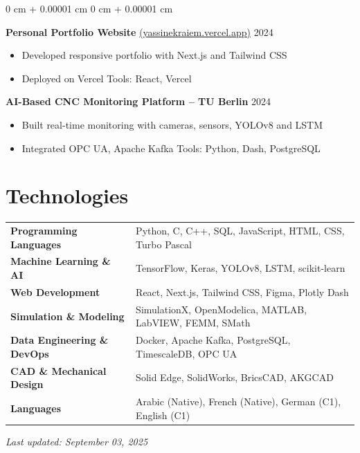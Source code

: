 \documentclass[10pt, letterpaper]{article}
\newenvironment{highlights}{
    \begin{itemize}[
        topsep=0.10 cm,
        parsep=0.10 cm,
        partopsep=0pt,
        itemsep=0pt,
        leftmargin=0 cm + 10pt
    ]
}{
    \end{itemize}
} %
\newenvironment{onecolentry}{
    \begin{adjustwidth}{
        0 cm + 0.00001 cm
    }{
        0 cm + 0.00001 cm
    }
}{
    \end{adjustwidth}
} %
\begin{document}
\begin{onecolentry}
\textbf{Personal Portfolio Website }\href{https://yassinekraiem.vercel.app}{\small (yassinekraiem.vercel.app)}
  \hfill \textsc{\phantom{202}2024} \\
\begin{highlights}
  \item Developed responsive portfolio with Next.js and Tailwind CSS
  \item Deployed on Vercel \textbullet{} Tools: React, Vercel
\end{highlights}

\textbf{AI-Based CNC Monitoring Platform – TU Berlin} \hfill \textsc{\phantom{202}2024} \\

\begin{highlights}
  \item Built real-time monitoring with cameras, sensors, YOLOv8 and LSTM 
  \item Integrated OPC UA, Apache Kafka \textbullet{} Tools: Python, Dash, PostgreSQL
\end{highlights}

\end{onecolentry}
    \vspace{-0.35cm}

\section{Technologies}
\begin{tabular}{@{}p{5cm}p{10.5cm}@{}}
\textbf{Programming Languages} & Python, C, C++, SQL, JavaScript, HTML, CSS, Turbo Pascal \\
\textbf{Machine Learning \& AI} & TensorFlow, Keras, YOLOv8, LSTM, scikit-learn \\
\textbf{Web Development} & React, Next.js, Tailwind CSS, Figma, Plotly Dash \\
\textbf{Simulation \& Modeling} & SimulationX, OpenModelica, MATLAB, LabVIEW, FEMM, SMath \\
\textbf{Data Engineering \& DevOps} & Docker, Apache Kafka, PostgreSQL, TimescaleDB, OPC UA \\
\textbf{CAD \& Mechanical Design} & Solid Edge, SolidWorks, BricsCAD, AKGCAD \\
\textbf{Languages} & Arabic (Native), French (Native), German (C1), English (C1) \\
\end{tabular}

\vspace{-0.24cm}
\begin{flushright}
\textit{Last updated: September 03, 2025}
\end{flushright}
\end{document}
